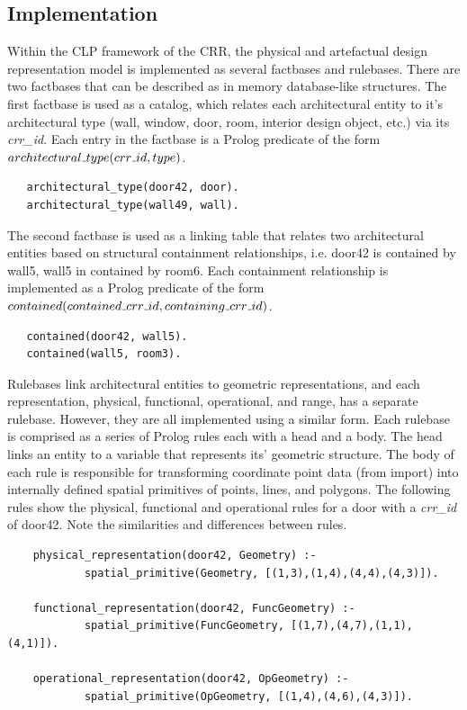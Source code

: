 \documentclass[12pt]{ucthesis}
\begin{document}
\subsection{Implementation}
Within the CLP framework of the CRR, the physical and artefactual design representation model is implemented as several factbases and rulebases. There are two factbases that can be described as in memory database-like structures. The first factbase is used as a catalog, which relates each architectural entity to it's architectural type (wall, window, door, room, interior design object, etc.) via its \emph{crr\_id}. Each entry in the factbase is a Prolog predicate of the form $architectural \mathunderscore type(crr \mathunderscore id, type)$.
\begin{verbatim}
   architectural_type(door42, door).
   architectural_type(wall49, wall).
\end{verbatim} The second factbase is used as a linking table that relates two architectural entities based on structural containment relationships, i.e. door42 is contained by wall5, wall5 in contained by room6. Each containment relationship is implemented as a Prolog predicate of the form $contained(contained \mathunderscore crr \mathunderscore id, containing \mathunderscore crr \mathunderscore id)$.
\begin{verbatim}
   contained(door42, wall5).
   contained(wall5, room3).
\end{verbatim} 

Rulebases link architectural entities to geometric representations, and each representation, physical, functional, operational, and range, has a separate rulebase. However, they are all implemented using a similar form. Each rulebase is comprised as a series of Prolog rules each with a head and a body. The head links an entity to a variable that represents its' geometric structure. The body of each rule is responsible for transforming coordinate point data (from import) into internally defined spatial primitives of points, lines, and polygons. The following rules show the physical, functional and operational rules for a door with a \emph{crr\_id} of door42. Note the similarities and differences between rules.
\begin{verbatim}
    physical_representation(door42, Geometry) :-
            spatial_primitive(Geometry, [(1,3),(1,4),(4,4),(4,3)]).
            
    functional_representation(door42, FuncGeometry) :-
            spatial_primitive(FuncGeometry, [(1,7),(4,7),(1,1),(4,1)]).
            
    operational_representation(door42, OpGeometry) :-
            spatial_primitive(OpGeometry, [(1,4),(4,6),(4,3)]).
\end{verbatim} 
\end{document}
